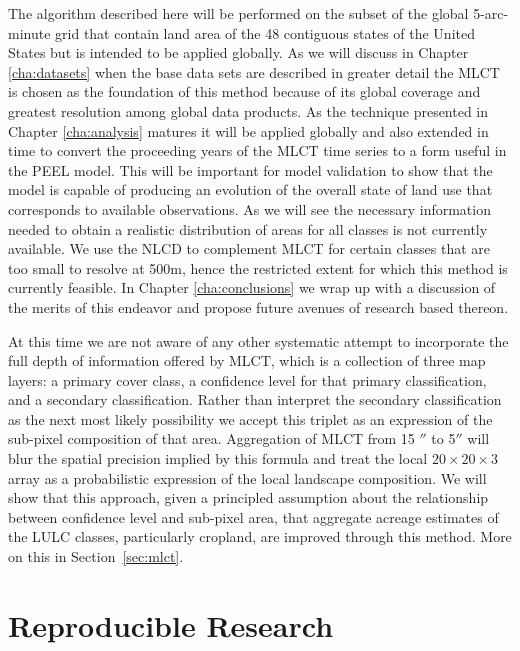 The algorithm described here will be performed on the subset of the
global 5-arc-minute grid that contain land area of the 48 contiguous
states of the United States but is intended to be applied globally.
As we will discuss in Chapter \ref{cha:datasets} when the base data
sets are described in greater detail the MLCT is chosen as the
foundation of this method because of its global coverage and greatest
resolution among global data products.  As the technique presented in
Chapter \ref{cha:analysis} matures it will be applied globally and
also extended in time to convert the proceeding years of the MLCT time
series to a form useful in the PEEL model.  This will be important for
model validation to show that the model is capable of producing an
evolution of the overall state of land use that corresponds to
available observations.  As we will see the necessary information
needed to obtain a realistic distribution of areas for all classes is
not currently available.  We use the NLCD to complement MLCT for
certain classes that are too small to resolve at 500m, hence the
restricted extent for which this method is currently feasible.  In
Chapter \ref{cha:conclusions} we wrap up with a discussion of the
merits of this endeavor and propose future avenues of research based
thereon.

At this time we are not aware of any other systematic attempt to
incorporate the full depth of information offered by MLCT, which is a
collection of three map layers: a primary cover class, a confidence
level for that primary classification, and a secondary classification.
Rather than interpret the secondary classification as the next most
likely possibility we accept this triplet as an expression of the
sub-pixel composition of that area.  Aggregation of MLCT from 15
$''$ to 5$''$ will blur the spatial precision implied
by this formula and treat the local $20 \times 20 \times 3$ array as a
probabilistic expression of the local landscape composition.  We will
show that this approach, given a principled assumption about the
relationship between confidence level and sub-pixel area, that
aggregate acreage estimates of the LULC classes, particularly
cropland, are improved through this method.  More on this in Section~\ref{sec:mlct}.

\section{Reproducible Research}
\label{sec:reproducible}

